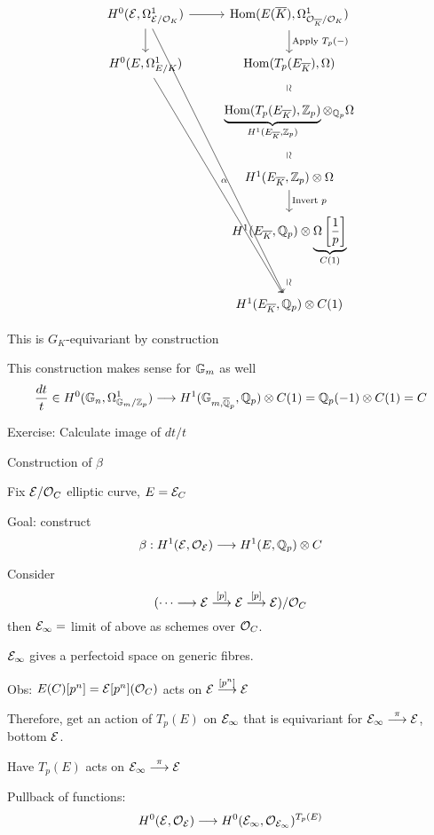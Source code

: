 	\[
	\begin{tikzcd}
	H^0(\E,\Omega^1_{\E/\O_K}) \arrow{r} \arrow{d} \arrow{rddddd} & \Hom(E(\ov{K}), \Omega^1_{\O_{\ov{K}}/\O_K}) \arrow{d}{\text{Apply } T_p(-)} \\
	H^0(E,\Omega_{E/K}^1) \arrow{rdddd}{\alpha} & \Hom(T_p(E_{\ov{K}}), \Omega) \arrow[draw=none]{d}[sloped,auto=false]{\simeq} \\
	& \underbrace{\Hom(T_p(E_{\ov{K}}), \Z_p)}_{H^1(E_{\ov{K}},\Z_p)} \otimes_{\Q_p} \Omega \arrow[draw=none]{d}[sloped,auto=false]{\simeq} \\
	& H^1(E_{\ov{K}}, \Z_p) \otimes \Omega \arrow{d}{\text{Invert }p} \\
	& H^1(E_{\ov{K}}, \Q_p) \otimes \underbrace{\Omega\left[\dfrac{1}{p}\right]}_{C(1)} \arrow[draw=none]{d}[sloped,auto=false]{\simeq} \\
	& H^1(E_{\ov{K}}, \Q_p) \otimes C(1)
	\end{tikzcd}
	\]

This is $G_K$-equivariant by construction


\begin{rem}
This construction makes sense for $\mathbb{G}_m$ as well
	\[
	\dfrac{dt}{t} \in H^0(\mathbb{G}_n, \Omega^1_{\mathbb{G}_m/\mathbb{Z}_p}) \stackrel{}{\longrightarrow} H^1(\mathbb{G}_{m, \overline{\mathbb{Q}}_p}, \mathbb{Q}_p) \otimes C(1) = \mathbb{Q}_p(-1) \otimes C(1)= C
	\]
\end{rem}

Exercise: Calculate image of $dt/t$



Construction of $\beta$

Fix $\mathcal{E}/\mathcal{O}_C$ elliptic curve, $E= \mathcal{E}_C$

Goal: construct
	\[
	\beta: H^1(\mathcal{E},\mathcal{O}_{\mathcal{E}}) \stackrel{}{\longrightarrow} H^1(E, \mathbb{Q}_p) \otimes C
	\]

Consider
	\[
	( \cdots \stackrel{}{\longrightarrow} \mathcal{E} \stackrel{[p]}{\longrightarrow} \mathcal{E} \stackrel{[p]}{\longrightarrow} \mathcal{E})/ \mathcal{O}_C
	\]
then $\mathcal{E}_\infty=$ limit of above as schemes over $\mathcal{O}_C$.


\begin{rem}
$\mathcal{E}_\infty$ gives a perfectoid space on generic fibres. 
\end{rem}

Obs: $E(C)[p^n]= \mathcal{E}[p^n](\mathcal{O}_C)$ acts on $\mathcal{E} \stackrel{[p^n]}{\longrightarrow} \mathcal{E}$

Therefore, get an action of $T_p(E)$ on $\mathcal{E}_\infty$ that is equivariant for $\mathcal{E}_\infty \stackrel{\pi}{\longrightarrow} \mathcal{E}$, bottom $\mathcal{E}$.

Have $T_p(E)$ acts on $\mathcal{E}_\infty \stackrel{\pi}{\longrightarrow} \mathcal{E}$

Pullback of functions:
	\[
	H^0(\mathcal{E},\mathcal{O}_{\mathcal{E}}) \stackrel{}{\longrightarrow} H^0(\mathcal{E}_\infty, \mathcal{O}_{\mathcal{E}_\infty})^{T_p(E)}
	\]


